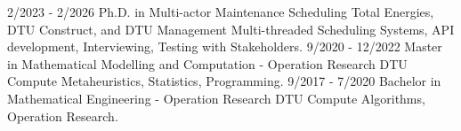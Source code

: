 \documentclass[9pt]{developercv} %
\begin{document}
\vspace{-10 pt}
\begin{entrylist}
	\entry
		{2/2023 - 2/2026}
		{Ph.D. in Multi-actor Maintenance Scheduling}
		{Total Energies, DTU Construct, and DTU Management}
		{
			Multi-threaded Scheduling Systems, API development, Interviewing, Testing with Stakeholders. 
		}
    \entry
		{9/2020 - 12/2022}
		{Master in Mathematical Modelling and Computation - Operation Research }
		{DTU Compute}
		{
			Metaheuristics, Statistics, Programming. 
		}
    \entry
		{9/2017 - 7/2020}
		{Bachelor in Mathematical Engineering - Operation Research}
		{DTU Compute}
		{
			Algorithms, Operation Research.
		}
\end{entrylist}
\end{document}
